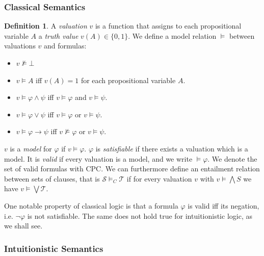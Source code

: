 \documentclass[a4paper,11pt]{report}
\theoremstyle{definition}
\theoremstyle{definition}
\theoremstyle{definition}
\theoremstyle{definition}
\theoremstyle{definition}
\newtheorem{definition}[theorem]{Definition}
\theoremstyle{definition}
\theoremstyle{definition}
\begin{document}
	\subsubsection{Classical Semantics}
	
	\begin{definition}
		A \textit{valuation} $v$ is a function that assigns to each propositional variable $A$ a \textit{truth value} $v(A)\in\{0, 1\}$. We define a model relation $\models$ between valuations $v$ and formulas:
		\begin{itemize}
			\item $v\not\models \bot$
			\item $v\models A$ iff $v(A) = 1$ for each propositional variable $A$.
			\item $v\models \varphi\wedge\psi$ iff $v\models\varphi$ and $v\models\psi$.
			\item $v\models\varphi\vee\psi$ iff $v\models\varphi$ or $v\models\psi$.
			\item $v\models\varphi\to \psi$ iff $v\not\models\varphi$ or $v\models\psi$.
		\end{itemize}
		$v$ is a \textit{model} for $\varphi$ if $v\models\varphi$. $\varphi$ is \textit{satisfiable} if there exists a valuation which is a model. It is \textit{valid} if every valuation is a model, and we write $\models \varphi$. We denote the set of valid formulas with CPC. We can furthermore define an entailment relation between sets of clauses, that is $\mathcal S\models_C \mathcal T$ if for every valuation $v$ with $v\models\bigwedge S$ we have $v\models\bigvee \mathcal T$.
	\end{definition}
	
	One notable property of classical logic is that a formula $\varphi$ is valid iff its negation, i.e. $\neg\varphi$ is not satisfiable. The same does not hold true for intuitionistic logic, as we shall see.

	\subsubsection{Intuitionistic Semantics}
	
\end{document}
